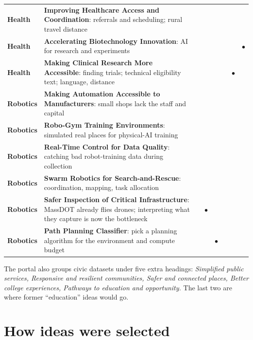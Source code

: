 \documentclass[11pt]{article}
\newcommand{\tagR}{\textcolor{robo}{\textbf{Robotics}}}
\newcommand{\tagH}{\textcolor{health}{\textbf{Health}}}
\newcommand{\yes}{\textcolor{okgreen}{\textbf{$\bullet$}}}
\begin{document}
\begin{longtable}{@{}L{1.6cm} L{8.3cm} c c c c c c@{}}
\tagH & \textbf{Improving Healthcare Access and Coordination}: referrals and scheduling; rural travel distance &&&&&&\\
\tagH & \textbf{Accelerating Biotechnology Innovation}: AI for research and experiments &&&&&& \yes\\
\tagH & \textbf{Making Clinical Research More Accessible}: finding trials; technical eligibility text; language, distance &&&&&\yes&\\
\tagR & \textbf{Making Automation Accessible to Manufacturers}: small shops lack the staff and capital &&&&&&\\
\tagR & \textbf{Robo-Gym Training Environments}: simulated real places for physical-AI training &&&&&&\\
\tagR & \textbf{Real-Time Control for Data Quality}: catching bad robot-training data during collection &&&&&&\\
\tagR & \textbf{Swarm Robotics for Search-and-Rescue}: coordination, mapping, task allocation &&&&&&\\
\tagR & \textbf{Safer Inspection of Critical Infrastructure}: MassDOT already flies drones; interpreting what they capture is now the bottleneck && \yes &&&&\\
\tagR & \textbf{Path Planning Classifier}: pick a planning algorithm for the environment and compute budget &&& \yes &&&\\
\bottomrule
\end{longtable}

The portal also groups civic datasets under five extra headings: \emph{Simplified public
services, Responsive and resilient communities, Safer and connected places, Better college
experiences, Pathways to education and opportunity.} The last two are where former
``education'' ideas would go.

\section{How ideas were selected}
\end{document}
